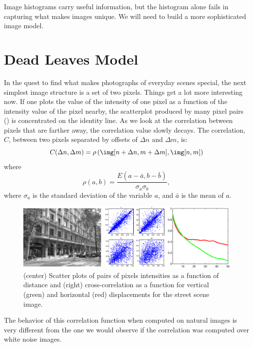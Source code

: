 Image histograms carry useful information, but the histogram alone fails in capturing what makes images unique. We will need to build a more sophisticated image model.


\section{Dead Leaves Model}
\label{sec:dead_leavel_model}


In the quest to find what makes photographs of everyday scenes special, the next simplest image structure is a set of two pixels. Things get a lot more interesting now. If one plots the value of the intensity of one pixel as a function of the intensity value of the pixel nearby, the scatterplot produced by many pixel pairs (\fig{\ref{fig:correlation}}) is concentrated on the identity line. As we look at the correlation between pixels that are farther away, the correlation value slowly decays. The correlation, $C$, between two pixels separated by offsets of $\Delta n$ and  $\Delta m$, is:
\begin{equation}
C(\Delta n, \Delta m) = \rho \left( \img [n+\Delta n,m+ \Delta m], \img [n,m] \right)
\label{eq:correlation_between_two_pixels}
\end{equation}
where 
\begin{equation}
\rho \left( a, b \right) = \frac{E \left( a-\bar{a}, b- \bar{b} \right)}{\sigma_a \sigma_b},
\end{equation}
where $\sigma_a$ is the standard deviation of the variable $a$, and $\bar{a}$ is the mean of $a$.

\begin{figure}
\centerline{
\includegraphics[width=1\linewidth]{figures/statistical_image_models/correlation.eps}
} 
\caption{(center) Scatter plots of pairs of pixels intensities as a function of distance and (right) cross-correlation as a function for vertical (green) and horizontal (red) displacements for the street scene image.} 
\label{fig:correlation}
\end{figure}

The behavior of this correlation function when computed on natural images is very different from the one we would observe if the correlation was computed over white noise images. 

